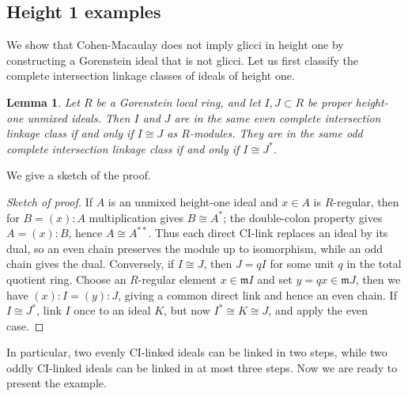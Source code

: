 \documentclass[11pt,letterpaper]{amsart}
\theoremstyle{plain}
\newtheorem{lem}[thm]{Lemma}
\theoremstyle{definition}
\theoremstyle{remark}
\begin{document}
\subsection{Height 1 examples}
We show that Cohen-Macaulay does not imply glicci in height one by constructing a Gorenstein ideal that is not glicci. Let us first classify the complete intersection linkage classes of ideals of height one.

\begin{lem}\label{CIlinkageclassesofheight1}
Let \(R\) be a Gorenstein local ring, and let \(I,J\subset R\) be proper height-one unmixed ideals. Then \(I\) and \(J\) are in the same even complete intersection linkage class if and only if \(I\cong J\) as \(R\)-modules. They are in the same odd complete intersection linkage class if and only if \(I\cong J^*\).
\end{lem}

We give a sketch of the proof. 
\begin{proof}[Sketch of proof]
If \(A\) is an unmixed height-one ideal and \(x\in A\) is \(R\)-regular, then for \(B=(x):A\) multiplication gives \(B\cong A^*\); the double-colon property gives \(A=(x):B\), hence \(A\cong A^{**}\). Thus each direct CI-link replaces an ideal by its dual, so an even chain preserves the module up to isomorphism, while an odd chain gives the dual. Conversely, if \(I\cong J\), then $J=qI$ for some unit $q$ in the total quotient ring. Choose an $R$-regular element $x\in\mathfrak m I$ and set $y=qx\in\mathfrak m J$, then we have \((x):I=(y):J\), giving a common direct link and hence an even chain. If \(I\cong J^*\), link \(I\) once to an ideal $K$, but now \(I^*\cong K\cong J\), and apply the even case.
\end{proof}

In particular, two evenly CI-linked ideals can be linked in two steps, while two oddly CI-linked ideals can be linked in at most three steps. Now we are ready to present the example.
\end{document}

